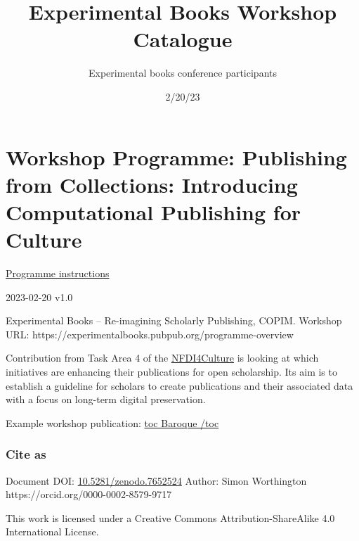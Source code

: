 \documentclass[
  letterpaper,
]{book}
\title{Experimental Books Workshop Catalogue}
\author{Experimental books conference participants}
\date{2/20/23}
\renewcommand*\contentsname{Table of contents}
\newcommand\contentsname{Table of contents}
\begin{document}
\frontmatter
\maketitle
\ifdefined\Shaded\renewenvironment{Shaded}{\begin{tcolorbox}[enhanced, boxrule=0pt, interior hidden, borderline west={3pt}{0pt}{shadecolor}, sharp corners, breakable, frame hidden]}{\end{tcolorbox}}\fi

\renewcommand*\contentsname{Table of contents}
{
\setcounter{tocdepth}{2}
\tableofcontents
}
\mainmatter
{}

\hypertarget{workshop-programme-publishing-from-collections-introducing-computational-publishing-for-culture}{%
\chapter{Workshop Programme: Publishing from Collections: Introducing
Computational Publishing for
Culture}\label{workshop-programme-publishing-from-collections-introducing-computational-publishing-for-culture}}

\href{https://mrchristian.github.io/Workshop-Publishing-from-Collections/}{Programme
instructions}

2023-02-20 v1.0

Experimental Books -- Re-imagining Scholarly Publishing, COPIM. Workshop
URL: https://experimentalbooks.pubpub.org/programme-overview

Contribution from Task Area 4 of the
\href{https://nfdi4culture.de/}{NFDI4Culture} is looking at which
initiatives are enhancing their publications for open scholarship. Its
aim is to establish a guideline for scholars to create publications and
their associated data with a focus on long-term digital preservation.

Example workshop publication:
\href{https://simonxix.github.io/Experimental_Books_workshop/}{toc
Baroque /toc}

\hypertarget{cite-as}{%
\subsection{Cite as~}\label{cite-as}}

Document DOI:
\href{https://doi.org/10.5281/zenodo.7652524}{10.5281/zenodo.7652524}
\textbar{} Author: Simon Worthington
https://orcid.org/0000-0002-8579-9717

This work is licensed under a Creative Commons Attribution-ShareAlike
4.0 International License.
\end{document}
